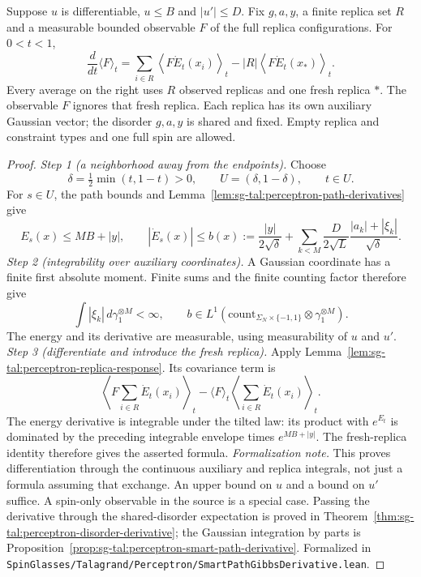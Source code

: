 \begin{theorem}\label{thm:sg-tal:perceptron-gibbs-derivative}
  \leanok
Suppose $u$ is differentiable, $u\le B$ and $|u'|\le D$. Fix $g,a,y$, a finite replica set $R$
and a measurable bounded observable $F$ of the full replica configurations. For $0<t<1$,
\[
 \frac d{dt}\langle F\rangle_t
 =\sum_{i\in R}\left\langle F\dot E_t(x_i)\right\rangle_t
 -|R|\left\langle F\dot E_t(x_*)\right\rangle_t.
\]
Every average on the right uses $R$ observed replicas and one fresh replica $*$.
The observable $F$ ignores that fresh replica. Each replica has its own auxiliary Gaussian
vector; the disorder $g,a,y$ is shared and fixed. Empty replica and constraint types and one
full spin are allowed.
\end{theorem}
\begin{proof}
  \leanok
\emph{Step 1 (a neighborhood away from the endpoints).} Choose
\[
 \delta=\tfrac12\min(t,1-t)>0,\qquad U=(\delta,1-\delta),\qquad t\in U.
\]
For $s\in U$, the path bounds and Lemma~\ref{lem:sg-tal:perceptron-path-derivatives} give
\[
 E_s(x)\le MB+|y|,\qquad
 |\dot E_s(x)|\le b(x):=\frac{|y|}{2\sqrt\delta}
 +\sum_{k<M}\frac D{2\sqrt L}\frac{|a_k|+|\xi_k|}{\sqrt\delta}.
\]
\emph{Step 2 (integrability over auxiliary coordinates).} A Gaussian coordinate has a finite
first absolute moment. Finite sums and the finite counting factor therefore give
\[
 \int |\xi_k|\,d\gamma_1^{\otimes M}<\infty,\qquad
 b\in L^1(\mathrm{count}_{\Sigma_N\times\{-1,1\}}\otimes\gamma_1^{\otimes M}).
\]
The energy and its derivative are measurable, using measurability of $u$ and $u'$.
\emph{Step 3 (differentiate and introduce the fresh replica).} Apply
Lemma~\ref{lem:sg-tal:perceptron-replica-response}. Its covariance term is
\[
 \left\langle F\sum_{i\in R}\dot E_t(x_i)\right\rangle_t
 -\langle F\rangle_t\left\langle\sum_{i\in R}\dot E_t(x_i)\right\rangle_t.
\]
The energy derivative is integrable under the tilted law: its product with $e^{E_t}$
is dominated by the preceding integrable envelope times $e^{MB+|y|}$. The fresh-replica
identity therefore gives the asserted formula.
\emph{Formalization note.} This proves differentiation through the continuous auxiliary and
replica integrals, not just a formula assuming that exchange. An upper bound on $u$ and a
bound on $u'$ suffice. A spin-only observable in the source is a special case. Passing the
derivative through the shared-disorder expectation is proved in
Theorem~\ref{thm:sg-tal:perceptron-disorder-derivative}; the Gaussian integration by parts is Proposition~\ref{prop:sg-tal:perceptron-smart-path-derivative}.
Formalized in \texttt{SpinGlasses/Talagrand/Perceptron/SmartPathGibbsDerivative.lean}.
\end{proof}

